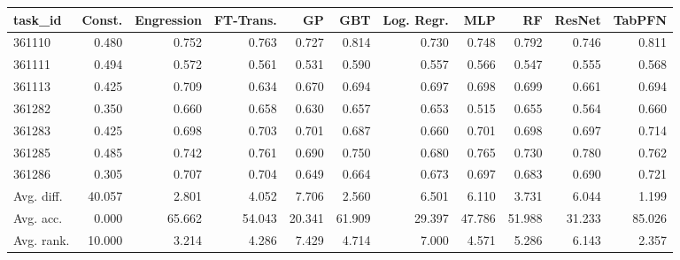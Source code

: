 \begin{tabular}{lrrrrrrrrrr}
\toprule
task\_id & Const. & Engression & FT-Trans. & GP & GBT & Log. Regr. & MLP & RF & ResNet & TabPFN \\
\midrule
361110 & 0.480 & 0.752 & 0.763 & 0.727 & 0.814 & 0.730 & 0.748 & 0.792 & 0.746 & 0.811 \\
361111 & 0.494 & 0.572 & 0.561 & 0.531 & 0.590 & 0.557 & 0.566 & 0.547 & 0.555 & 0.568 \\
361113 & 0.425 & 0.709 & 0.634 & 0.670 & 0.694 & 0.697 & 0.698 & 0.699 & 0.661 & 0.694 \\
361282 & 0.350 & 0.660 & 0.658 & 0.630 & 0.657 & 0.653 & 0.515 & 0.655 & 0.564 & 0.660 \\
361283 & 0.425 & 0.698 & 0.703 & 0.701 & 0.687 & 0.660 & 0.701 & 0.698 & 0.697 & 0.714 \\
361285 & 0.485 & 0.742 & 0.761 & 0.690 & 0.750 & 0.680 & 0.765 & 0.730 & 0.780 & 0.762 \\
361286 & 0.305 & 0.707 & 0.704 & 0.649 & 0.664 & 0.673 & 0.697 & 0.683 & 0.690 & 0.721 \\
Avg. diff. & 40.057 & 2.801 & 4.052 & 7.706 & 2.560 & 6.501 & 6.110 & 3.731 & 6.044 & 1.199 \\
Avg. acc. & 0.000 & 65.662 & 54.043 & 20.341 & 61.909 & 29.397 & 47.786 & 51.988 & 31.233 & 85.026 \\
Avg. rank. & 10.000 & 3.214 & 4.286 & 7.429 & 4.714 & 7.000 & 4.571 & 5.286 & 6.143 & 2.357 \\
\bottomrule
\end{tabular}
